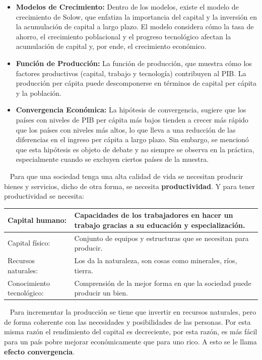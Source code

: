 \documentclass[
  letterpaper,
  DIV=11,
  numbers=noendperiod]{scrreport}
\begin{document}
\begin{itemize}
\item
  \textbf{Modelos de Crecimiento:} Dentro de los modelos, existe el
  modelo de crecimiento de Solow, que enfatiza la importancia del
  capital y la inversión en la acumulación de capital a largo plazo. El
  modelo considera cómo la tasa de ahorro, el crecimiento poblacional y
  el progreso tecnológico afectan la acumulación de capital y, por ende,
  el crecimiento económico.
\item
  \textbf{Función de Producción:} La función de producción, que muestra
  cómo los factores productivos (capital, trabajo y tecnología)
  contribuyen al PIB. La producción per cápita puede descomponerse en
  términos de capital per cápita y la población.
\item
  \textbf{Convergencia Económica:} La hipótesis de convergencia, sugiere
  que los países con niveles de PIB per cápita más bajos tienden a
  crecer más rápido que los países con niveles más altos, lo que lleva a
  una reducción de las diferencias en el ingreso per cápita a largo
  plazo. Sin embargo, se mencionó que esta hipótesis es objeto de debate
  y no siempre se observa en la práctica, especialmente cuando se
  excluyen ciertos países de la muestra.
\end{itemize}

~ Para que una sociedad tenga una alta calidad de vida se necesitan
producir bienes y servicios, dicho de otra forma, se necesita
\textbf{productividad}. Y para tener productividad se necesita:

\begin{table}[H]
    \centering
    \begin{tabular}{|p{30mm}|p{90mm}|}
        \hline
        Capital humano: & Capacidades de los trabajadores en hacer un trabajo gracias a su educación y especialización. \\ \hline
        Capital físico: & Conjunto de equipos y estructuras que se necesitan para producir. \\ \hline
        Recursos naturales: & Los da la naturaleza, son cosas como minerales, ríos, tierra. \\ \hline
        Conocimiento tecnológico: & Comprensión de la mejor forma en que la sociedad puede producir un bien. \\ \hline
    \end{tabular}
    
\end{table}

~ Para incrementar la producción se tiene que invertir en recursos
naturales, pero de forma coherente con las necesidades y posibilidades
de las personas. Por esta misma razón el rendimiento del capital es
decreciente, por esta razón, es más fácil para un país pobre mejorar
económicamente que para uno rico. A esto se le llama \textbf{efecto
convergencia}.
\end{document}

